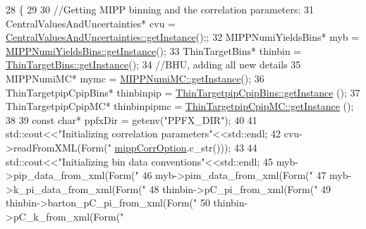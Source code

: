 \begin{DoxyCode}
28                                \{
29     
30     \textcolor{comment}{//Getting MIPP binning and the correlation parameters:}
31     CentralValuesAndUncertainties* cvu = 
      \hyperlink{class_neutrino_flux_reweight_1_1_central_values_and_uncertainties_a36e1ceb53aeee872f466785938c7513a}{CentralValuesAndUncertainties::getInstance}();;
32     MIPPNumiYieldsBins*  myb =  \hyperlink{class_neutrino_flux_reweight_1_1_m_i_p_p_numi_yields_bins_a7f44afe90a846812d6eabfafa8f576e4}{MIPPNumiYieldsBins::getInstance}(); 
33     ThinTargetBins*  thinbin =  \hyperlink{class_neutrino_flux_reweight_1_1_thin_target_bins_aeff5cf7220dd08322f5abac2cbc7ff33}{ThinTargetBins::getInstance}();
34   \textcolor{comment}{//BHU, adding all new details }
35     MIPPNumiMC*  mymc =  \hyperlink{class_neutrino_flux_reweight_1_1_m_i_p_p_numi_m_c_a4324da8640cc9a0d157d82e08da3a1c3}{MIPPNumiMC::getInstance}();
36     ThinTargetpipCpipBins*  thinbinpip =    \hyperlink{class_neutrino_flux_reweight_1_1_thin_targetpip_cpip_bins_aa9b4bec763ea562867a0d8ab9415f2c8}{ThinTargetpipCpipBins::getInstance}
      ();
37     ThinTargetpipCpipMC*    thinbinpipmc =  \hyperlink{class_neutrino_flux_reweight_1_1_thin_targetpip_cpip_m_c_aeeb5ad3ed4803b1122286f49d1897729}{ThinTargetpipCpipMC::getInstance}
      ();
38 
39     \textcolor{keyword}{const} \textcolor{keywordtype}{char}* ppfxDir = getenv(\textcolor{stringliteral}{"PPFX\_DIR"});
40        
41     std::cout<<\textcolor{stringliteral}{"Initializing correlation parameters"}<<std::endl;
42     cvu->readFromXML(Form(\textcolor{stringliteral}{"%
      \hyperlink{class_neutrino_flux_reweight_1_1_make_reweight_a642f0605b4a34674afaf5add7512c66a}{mippCorrOption}.c\_str()));
43     
44     std::cout<<\textcolor{stringliteral}{"Initializing bin data conventions"}<<std::endl;
45     myb->pip\_data\_from\_xml(Form(\textcolor{stringliteral}{"%
46     myb->pim\_data\_from\_xml(Form(\textcolor{stringliteral}{"%
47     myb->k\_pi\_data\_from\_xml(Form(\textcolor{stringliteral}{"%
48     thinbin->pC\_pi\_from\_xml(Form(\textcolor{stringliteral}{"%
49     thinbin->barton\_pC\_pi\_from\_xml(Form(\textcolor{stringliteral}{"%
50     thinbin->pC\_k\_from\_xml(Form(\textcolor{stringliteral}{"%
}}}}}}}
\end{DoxyCode}
